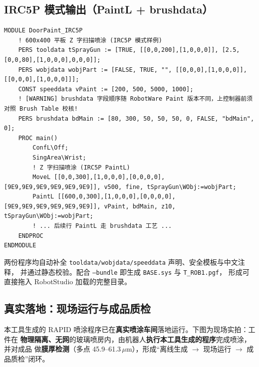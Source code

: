 \documentclass[12pt,a4paper,fontset=none]{ctexart}
\begin{document}
\subsection{IRC5P 模式输出（PaintL + brushdata）}
\begin{lstlisting}[style=rapid,caption={DoorPaint\_IRC5P.mod（节选）——Paint 控制器，brushdata 自动管理喷涂时序}]
MODULE DoorPaint_IRC5P
    ! 600x400 平板 Z 字扫描喷涂 (IRC5P 模式样例)
    PERS tooldata tSprayGun := [TRUE, [[0,0,200],[1,0,0,0]], [2.5,[0,0,80],[1,0,0,0],0,0,0]];
    PERS wobjdata wobjPart := [FALSE, TRUE, "", [[0,0,0],[1,0,0,0]], [[0,0,0],[1,0,0,0]]];
    CONST speeddata vPaint := [200, 500, 5000, 1000];
    ! [WARNING] brushdata 字段顺序随 RobotWare Paint 版本不同，上控制器前须对照 Brush Table 校核!
    PERS brushdata bdMain := [80, 300, 50, 50, 50, 0, FALSE, "bdMain", 0];
    PROC main()
        ConfL\Off;
        SingArea\Wrist;
        ! Z 字扫描喷涂 (IRC5P PaintL)
        MoveL [[0,0,300],[1,0,0,0],[0,0,0,0],[9E9,9E9,9E9,9E9,9E9,9E9]], v500, fine, tSprayGun\WObj:=wobjPart;
        PaintL [[600,0,300],[1,0,0,0],[0,0,0,0],[9E9,9E9,9E9,9E9,9E9,9E9]], vPaint, bdMain, z10, tSprayGun\WObj:=wobjPart;
        ! ... 后续行 PaintL 走 brushdata 工艺 ...
    ENDPROC
ENDMODULE
\end{lstlisting}

\noindent 两份程序均自动补全 \texttt{tooldata/wobjdata/speeddata} 声明、安全模板与中文注释，
并通过静态校验。配合 \texttt{--bundle} 即生成 \texttt{BASE.sys} 与 \texttt{T\_ROB1.pgf}，
形成可直接拖入 RobotStudio 加载的完整目录。

\subsection{真实落地：现场运行与成品质检}
本工具生成的 RAPID 喷涂程序已在\textbf{真实喷涂车间}落地运行。下图为现场实拍：工件在
\textbf{物理隔离、无网}的玻璃喷房内，由机器人\textbf{执行本工具生成的程序}完成喷涂，并对成品
做\textbf{膜厚检测}（多点 45.9--61.3\,$\mu$m），形成“离线生成 $\to$ 现场运行 $\to$ 成品质检”闭环。
\end{document}
